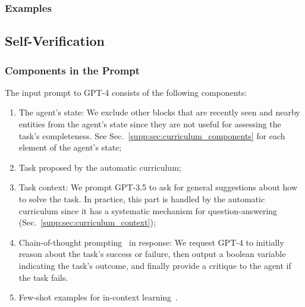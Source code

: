 \subsubsection{Examples}
\renewcommand\lstlistingname{Skill library example}
\setcounter{lstlisting}{0}







\subsection{Self-Verification}
\label{supp:sec:self_verification}
\subsubsection{Components in the Prompt}
The input prompt to GPT-4 consists of the following components: 
\begin{enumerate}[label=(\arabic*)]
\item The agent's state: We exclude other blocks that are recently seen and nearby entities from the agent's state since they are not useful for assessing the task's completeness. See Sec.~\ref{supp:sec:curriculum_components} for each element of the agent's state;
\item Task proposed by the automatic curriculum;
\item Task context: We prompt GPT-3.5 to ask for general suggestions about how to solve the task. In practice, this part is handled by the automatic curriculum since it has a systematic mechanism for question-answering (Sec.~\ref{supp:sec:curriculum_context});
\item Chain-of-thought prompting~\cite{wei2022chain} in response: We request GPT-4 to initially reason about the task's success or failure, then output a boolean variable indicating the task's outcome, and finally provide a critique to the agent if the task fails.
\item Few-shot examples for in-context learning~\cite{wei2022emergent,brown2020gpt3,raffel2020t5}.
\end{enumerate}
